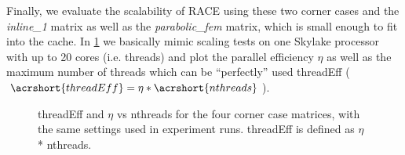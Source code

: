 Finally, we evaluate the scalability of RACE using these two corner cases and the \emph{inline\_1} matrix as well as the \emph{parabolic\_fem} matrix, which is small enough to fit into the cache. 
In \cref{fig:corner_cases_param} we basically mimic scaling tests on one Skylake processor with up to 20 cores (i.e. threads) and plot the parallel efficiency $\eta$ as well as the maximum number of threads which can be ``perfectly'' used \acrshort{threadEff} (\ie $\acrshort{threadEff} = \eta*\acrshort{nthreads}$). 
%
\begin{figure}[tbhp]
	\centering
	\caption{\acrshort{threadEff} and $\eta$ vs \acrshort{nthreads} for the four corner case matrices, with the same settings used in experiment runs. \acrshort{threadEff} is defined as $\eta$ * \acrshort{nthreads}.}
	\label{fig:corner_cases_param}
\end{figure}

